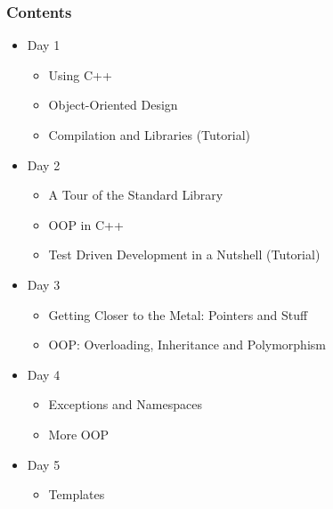 \documentclass{slides}
\begin{document}
\begin{frame}
  \frametitle{Contents}
  \begin{itemize}
  \item Day 1
    \begin{itemize}
    \item Using C++
    \item Object-Oriented Design
    \item Compilation and Libraries (Tutorial)
    \end{itemize}
  \item Day 2
    \begin{itemize}
    \item A Tour of the Standard Library
    \item OOP in C++
    \item Test Driven Development in a Nutshell (Tutorial)
    \end{itemize}
  \item Day 3
    \begin{itemize}
    \item Getting Closer to the Metal: Pointers and Stuff
    \item OOP: Overloading, Inheritance and Polymorphism 
    \end{itemize}
    \item Day 4
      \begin{itemize}
      \item Exceptions and Namespaces
      \item More OOP
      \end{itemize}
    \item Day 5
      \begin{itemize}
      \item Templates
      \end{itemize}
  \end{itemize}
\end{frame}
\end{document}
